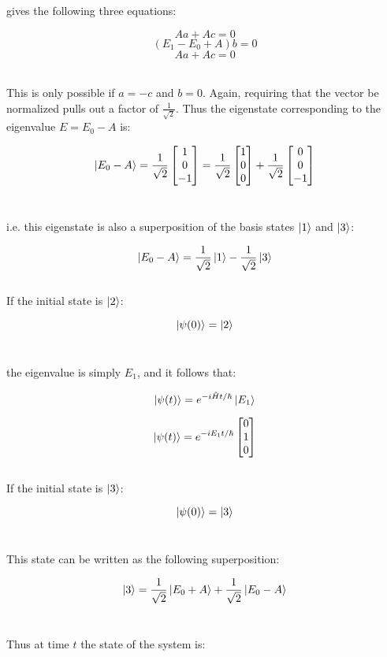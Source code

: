 \documentclass[9pt]{extarticle}
\begin{document}
\begin{multicols*}{2}
gives the following three equations:

$$Aa+Ac = 0$$
$$(E_1 - E_0 +A)b = 0$$
$$Aa+Ac = 0$$ \ 

This is only possible if $a = -c$ and $b = 0$. Again, requiring that the vector be normalized pulls out a factor of $\frac{1}{\sqrt 2}$. Thus the eigenstate corresponding to the eigenvalue $E = E_0-A$ is:

$$\ket{E_0-A} = \frac{1}{\sqrt 2}
\begin{bmatrix} 1 \\ 0 \\ -1 \end{bmatrix} = 
\frac{1}{\sqrt 2}
\begin{bmatrix} 1 \\ 0 \\ 0 \end{bmatrix} +
\frac{1}{\sqrt 2}
\begin{bmatrix} 0 \\ 0 \\ -1 \end{bmatrix}
$$ \ 

i.e. this eigenstate is also a superposition of the basis states $\ket 1$ and $\ket 3$:

$$\ket{E_0-A} = \frac{1}{\sqrt 2} \ket 1 - \frac{1}{\sqrt 2} \ket 3$$ \\ 




If the initial state is $\ket 2$:

$$\ket{\psi(0)} = \ket 2$$ \ 

the eigenvalue is simply $E_1$, and it follows that:

$$\ket{\psi(t)} = e^{-i \hat Ht/\hbar}  \ket{E_1}$$

$$
\ket{\psi(t)} = e^{-i E_1 t/ \hbar} 
\begin{bmatrix}
        0 \\ 1 \\ 0
\end{bmatrix}
$$ \\  

If the initial state is $\ket 3$: 

$$\ket{\psi(0)} = \ket 3$$ \
 
This state can be written as the following superposition:

$$\ket 3 = \frac{1}{\sqrt 2} \ket{E_0+A} + \frac{1}{\sqrt 2} \ket{E_0-A}$$ \ 

Thus at time $t$ the state of the system is:


\end{multicols*}
\end{document}
